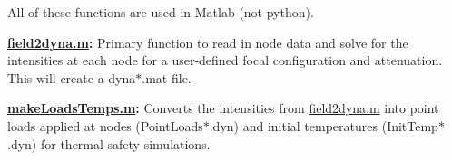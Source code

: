 All of these functions are used in Matlab (not python).


\begin{DoxyItemize}
\item {\bfseries \hyperlink{field2dyna_8m}{field2dyna.\+m}\+:} Primary function to read in node data and solve for the intensities at each node for a user-\/defined focal configuration and attenuation. This will create a {\ttfamily dyna$\ast$.mat} file.
\item {\bfseries \hyperlink{makeLoadsTemps_8m}{make\+Loads\+Temps.\+m}\+:} Converts the intensities from {\ttfamily \hyperlink{field2dyna_8m}{field2dyna.\+m}} into point loads applied at nodes ({\ttfamily Point\+Loads$\ast$.dyn}) and initial temperatures ({\ttfamily Init\+Temp$\ast$.dyn}) for thermal safety simulations. 
\end{DoxyItemize}